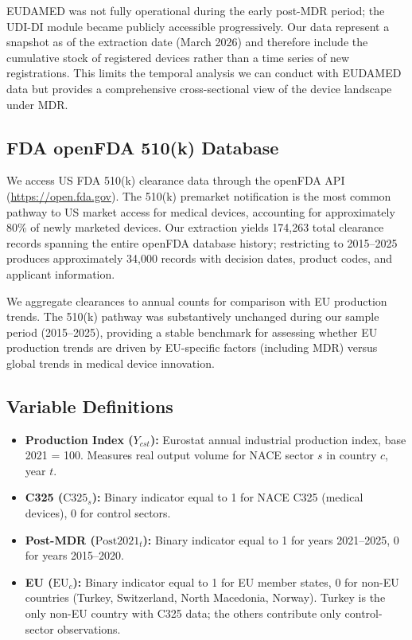 \documentclass[12pt]{article}
\begin{document}
EUDAMED was not fully operational during the early post-MDR period; the UDI-DI module became publicly accessible progressively. Our data represent a snapshot as of the extraction date (March 2026) and therefore include the cumulative stock of registered devices rather than a time series of new registrations. This limits the temporal analysis we can conduct with EUDAMED data but provides a comprehensive cross-sectional view of the device landscape under MDR.

\subsection{FDA openFDA 510(k) Database}

We access US FDA 510(k) clearance data through the openFDA API (\url{https://open.fda.gov}). The 510(k) premarket notification is the most common pathway to US market access for medical devices, accounting for approximately 80\% of newly marketed devices. Our extraction yields 174,263 total clearance records spanning the entire openFDA database history; restricting to 2015--2025 produces approximately 34,000 records with decision dates, product codes, and applicant information.

We aggregate clearances to annual counts for comparison with EU production trends. The 510(k) pathway was substantively unchanged during our sample period (2015--2025), providing a stable benchmark for assessing whether EU production trends are driven by EU-specific factors (including MDR) versus global trends in medical device innovation.

\subsection{Variable Definitions}

\begin{itemize}
\item \textbf{Production Index ($Y_{cst}$):} Eurostat annual industrial production index, base 2021 = 100. Measures real output volume for NACE sector $s$ in country $c$, year $t$.
\item \textbf{C325 ($\text{C325}_s$):} Binary indicator equal to 1 for NACE C325 (medical devices), 0 for control sectors.
\item \textbf{Post-MDR ($\text{Post2021}_t$):} Binary indicator equal to 1 for years 2021--2025, 0 for years 2015--2020.
\item \textbf{EU ($\text{EU}_c$):} Binary indicator equal to 1 for EU member states, 0 for non-EU countries (Turkey, Switzerland, North Macedonia, Norway). Turkey is the only non-EU country with C325 data; the others contribute only control-sector observations.
\end{itemize}
\end{document}
